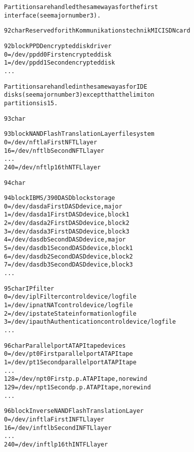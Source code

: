 \documentclass[a4paper,8pt,english]{sphinxmanual}
\begin{document}
\begin{alltt}
                Partitions are handled the same way as for the first
                interface (see major number 3).

  92 char       Reserved for ith Kommunikationstechnik MIC ISDN card

  92 block      PPDD encrypted disk driver
                  0 = /dev/ppdd0        First encrypted disk
                  1 = /dev/ppdd1        Second encrypted disk
                    ...

                Partitions are handled in the same way as for IDE
                disks (see major number 3) except that the limit on
                partitions is 15.

  93 char

  93 block      NAND Flash Translation Layer filesystem
                  0 = /dev/nftla        First NFTL layer
                 16 = /dev/nftlb        Second NFTL layer
                    ...
                240 = /dev/nftlp        16th NTFL layer

  94 char

  94 block      IBM S/390 DASD block storage
                  0 = /dev/dasda First DASD device, major
                  1 = /dev/dasda1 First DASD device, block 1
                  2 = /dev/dasda2 First DASD device, block 2
                  3 = /dev/dasda3 First DASD device, block 3
                  4 = /dev/dasdb Second DASD device, major
                  5 = /dev/dasdb1 Second DASD device, block 1
                  6 = /dev/dasdb2 Second DASD device, block 2
                  7 = /dev/dasdb3 Second DASD device, block 3
                    ...

  95 char       IP filter
                  0 = /dev/ipl          Filter control device/log file
                  1 = /dev/ipnat        NAT control device/log file
                  2 = /dev/ipstate      State information log file
                  3 = /dev/ipauth       Authentication control device/log file
                    ...

  96 char       Parallel port ATAPI tape devices
                  0 = /dev/pt0          First parallel port ATAPI tape
                  1 = /dev/pt1          Second parallel port ATAPI tape
                    ...
                128 = /dev/npt0         First p.p. ATAPI tape, no rewind
                129 = /dev/npt1         Second p.p. ATAPI tape, no rewind
                    ...

  96 block      Inverse NAND Flash Translation Layer
                  0 = /dev/inftla First INFTL layer
                 16 = /dev/inftlb Second INFTL layer
                    ...
                240 = /dev/inftlp       16th INTFL layer


\end{alltt}
\end{document}
